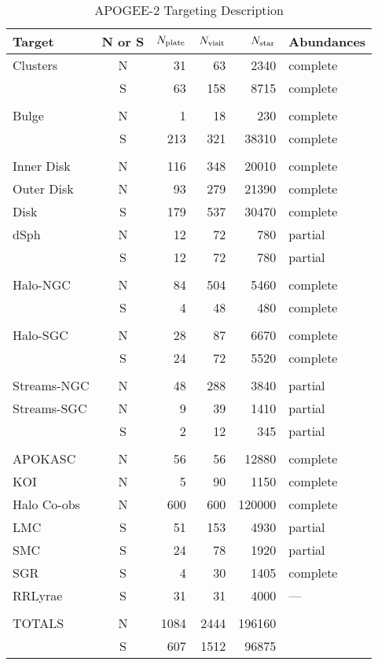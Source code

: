 \begin{table}[htp]
\centering
\caption{
\label{tab:apogeetargeting}
APOGEE-2 Targeting Description}
\begin{tabular}{l c r r r l}
\hline\hline
%
Target      & N or S & $N_{\rm plate}$ & $N_{\rm visit}$ & $N_{\rm
  star}$ & Abundances \\ \hline
%
Clusters    & N &  31 &   63 &  2340 & complete \\
            & S &  63 &  158 &  8715 & complete \\
\multicolumn{6}{c}{} \\ [-0.1in]
Bulge       & N &   1 &   18 &   230 & complete \\
            & S & 213 &  321 & 38310 & complete \\
\multicolumn{6}{c}{} \\ [-0.1in]
Inner Disk  & N & 116 &  348 & 20010 & complete \\
Outer Disk  & N &  93 &  279 & 21390 & complete \\
Disk        & S & 179 &  537 & 30470 & complete \\
dSph        & N &  12 &   72 &   780 & partial \\
            & S &  12 &   72 &   780 & partial \\
\multicolumn{6}{c}{} \\ [-0.1in]
Halo-NGC    & N &  84 &  504 &  5460 & complete \\
            & S &   4 &   48 &   480 & complete \\
\multicolumn{6}{c}{} \\ [-0.1in]
Halo-SGC    & N &  28 &   87 &  6670 & complete \\
            & S &  24 &   72 &  5520 & complete \\
\multicolumn{6}{c}{} \\ [-0.1in]
Streams-NGC & N &  48 &  288 &  3840 & partial \\
Streams-SGC & N &   9 &   39 &  1410 & partial \\
            & S &   2 &   12 &   345 & partial \\
\multicolumn{6}{c}{} \\ [-0.1in]
APOKASC     & N &  56 &   56 & 12880 & complete \\
KOI         & N &   5 &   90 &  1150 & complete \\
Halo Co-obs & N & 600 &  600 &120000 & complete \\
LMC         & S &  51 &  153 &  4930 & partial \\
SMC         & S &  24 &   78 &  1920 & partial \\
SGR         & S &   4 &   30 &  1405 & complete \\
RRLyrae     & S &  31 &   31 &  4000 & ---\\
\multicolumn{6}{c}{} \\ [-0.1in]
TOTALS      & N &1084 & 2444 &196160 & \\
            & S & 607 & 1512 & 96875 & \\ 
\hline
\end{tabular}
\end{table}

